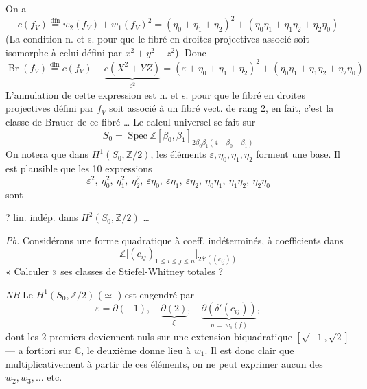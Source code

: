 \documentclass[11pt,a4paper]{article}
\begin{document}
On a
\[
c(f_V) \overset{\text{dfn}}{=} w_2(f_V) + w_1(f_V)^2 = (\eta_0 + \eta_1 + \eta_2)^2 + (\eta_0\eta_1 + \eta_1\eta_2 + \eta_2\eta_0)
\]
(La condition n. et s. pour que le fibré en droites projectives associé soit isomorphe à celui défini par \struck{\ill{}}  $x^2 + y^2 + z^2$). Donc
\[
\operatorname{Br}(f_V) \overset{\text{dfn}}{=} c(f_V) - \underbrace{c(X^2 + YZ)}_{\varepsilon^2} = (\varepsilon + \eta_0 + \eta_1 + \eta_2)^2 + (\eta_0\eta_1 + \eta_1\eta_2 + \eta_2\eta_0)
\]
L'annulation de cette expression est n. et s. pour que le fibré en droites projectives  défini par $f_V$ soit associé à un fibré vect. de rang 2, en fait, c'est la classe de Brauer de ce fibré … Le calcul universel se fait sur
\[
S_0 = \operatorname{Spec} \mathbb{Z}[\beta_0, \beta_1]_{2\beta_0\beta_1(4 - \beta_0 - \beta_1)}
\]
On notera que dans $H^1(S_0, \mathbb{Z}/2)$, les  éléments $\varepsilon, \eta_0, \eta_1, \eta_2$ forment une base. Il est plausible que les 10 expressions
\[
\varepsilon^2,\ \eta_0^2,\ \eta_1^2,\ \eta_2^2,\ \varepsilon\eta_0,\ \varepsilon\eta_1,\ \varepsilon\eta_2,\ \eta_0\eta_1,\ \eta_1\eta_2,\ \eta_2\eta_0
\]
sont

? lin. indép. dans $H^2(S_0, \mathbb{Z}/2)$ …

\emph{Pb.} Considérons une forme quadratique  à coeff. indéterminés, à coefficients dans
\[
\mathbb{Z}\bigl[(c_{ij})_{1 \leq i \leq j \leq n}\bigr]_{2\delta'((c_{ij}))}
\]
« Calculer » ses classes de Stiefel-Whitney totales ?

\emph{NB} Le $H^1(S_0, \mathbb{Z}/2)$ ($\simeq$ ) est engendré par
\[
\varepsilon = \partial(-1), \quad \underbrace{\partial(2)}_{\xi}, \quad \underbrace{\partial(\delta'(c_{ij}))}_{\eta \,=\, w_1(f)},
\]
dont les 2 premiers deviennent nuls sur une extension biquadratique $[\sqrt{-1}, \sqrt{2}]$ — a fortiori sur $\mathbb{C}$, le deuxième donne lieu à $w_1$. Il est donc clair que multiplicativement à partir de ces éléments, on ne peut exprimer aucun des $w_2, w_3, \dots$ etc.
\end{document}
